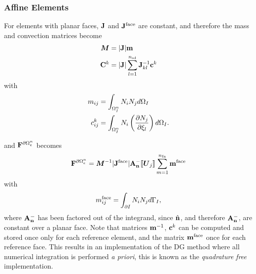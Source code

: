 \subsubsection{Affine Elements}
For elements with planar faces, $\mathbf{J}$ and $\mathbf{J}^{\textrm{face}}$ are constant,
and therefore the mass and convection matrices become
\begin{align*}
\boldsymbol{M} &= |\mathbf{J}| \mathbf{m} \\
\mathbf{C}^{k} &= |\mathbf{J}|
                               \sum_{l=1}^{n_\textrm{sd}}
                               \mathbf{J}_{kl}^{-1}
                               \mathbf{c}^{k}
\end{align*}
with
\begin{align*}
m_{ij} &= \int_{\Omega^{n}_{I}} N_i N_j d\Omega_{I} \\
c_{ij}^{k} &= \int_{\Omega^{n}_{I}} N_i
                             \left(
                               \frac{\partial N_j}{\partial \xi_{l}}
                             \right)
                             d\Omega_{I} .
\end{align*}

and $\mathbf{F}^{\partial \Omega_e^{n}}$ becomes
$$
\mathbf{F}^{\partial \Omega_e^{n}} = \boldsymbol{M}^{-1}
|\mathbf{J}^{\textrm{face}}| 
\mathbf{A}_\mathbf{n}^{-} \llbracket \boldsymbol{U}_j \rrbracket
 \sum_{m=1}^{n_\textrm{fn}}
 \mathbf{m}^{\textrm{face}}
$$
with
$$
 m^{\textrm{face}}_{ij} =
 \int_{\partial I}
N_i N_j d\Gamma_{I},
$$
where $\mathbf{A}_\mathbf{n}^{-}$ has been factored out of the integrand, since $\hat{\mathbf{n}}$, and therefore $\mathbf{A}_\mathbf{n}^{-}$, are constant over a planar face. Note that matrices $\mathbf{m}^{-1}$, $\mathbf{c}^{k}$ can be computed and stored once only for each reference element, and the matrix $\mathbf{m}^{\textrm{face}}$ once for each reference face. This results in an implementation of the DG method where all numerical integration is performed \textit{a priori}, this is known as the \textit{quadrature free} implementation\cite{Atkins and Shu 1998}.



